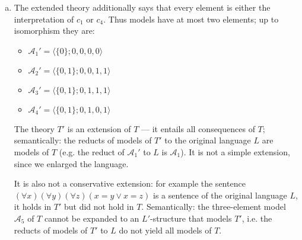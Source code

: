 \begin{problem}
\begin{solution}
\begin{enumerate}[(a)]
            \item The extended theory additionally says that every element is either the interpretation of $c_1$ or $c_4$. Thus models have at most two elements; up to isomorphism they are:
            \begin{itemize}
                \item $\mathcal A_1'=\langle\{0\};0,0,0,0\rangle$
                \item $\mathcal A_2'=\langle\{0,1\};0,0,1,1\rangle$
                \item $\mathcal A_3'=\langle\{0,1\};0,1,1,1\rangle$
                \item $\mathcal A_4'=\langle\{0,1\};0,1,0,1\rangle$                
            \end{itemize}
            The theory $T'$ is an extension of $T$ — it entails all consequences of $T$; semantically: the reducts of models of $T'$ to the original language $L$ are models of $T$ (e.g. the reduct of $\mathcal A_1'$ to $L$ is $\mathcal A_1$). It is not a simple extension, since we enlarged the language.
            
            It is also not a conservative extension: for example the sentence $(\forall x)(\forall y)(\forall z)(x=y\lor x=z)$ is a sentence of the original language $L$, it holds in $T'$ but did not hold in $T$. Semantically: the three-element model $\mathcal A_5$ of $T$ cannot be expanded to an $L'$-structure that models $T'$, i.e. the reducts of models of $T'$ to $L$ do not yield all models of $T$.

        \end{enumerate}
                    
    \end{solution}

\end{problem}


